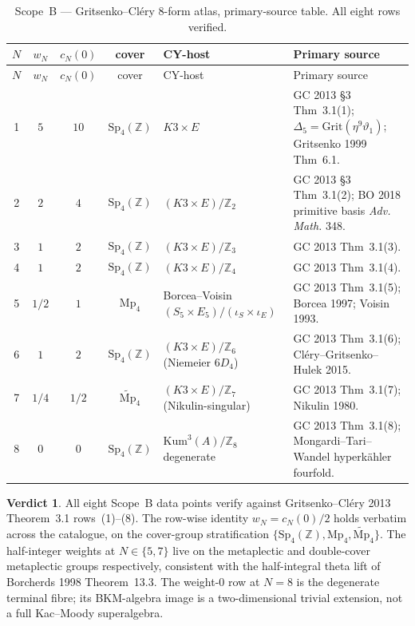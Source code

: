 \documentclass[11pt]{article}
\theoremstyle{definition}
\newtheorem*{verdict}{Verdict}
\begin{document}
\begin{longtable}{c|c|c|c|p{2.7cm}|p{3.5cm}}
\caption{Scope~B --- Gritsenko--Cl\'ery 8-form atlas, primary-source
table. All eight rows verified.}
\label{tab:scope-B} \\
\hline
$N$ & $w_N$ & $c_N(0)$ & cover & CY-host & Primary source \\
\hline
\endfirsthead
\hline
$N$ & $w_N$ & $c_N(0)$ & cover & CY-host & Primary source \\
\hline
\endhead
1 & $5$ & $10$ & $\mathrm{Sp}_4(\mathbb Z)$ & $K3 \times E$ &
GC 2013 \S 3 Thm~3.1(1); $\Delta_5 = \mathrm{Grit}(\eta^9 \vartheta_1)$;
Gritsenko 1999 Thm~6.1. \\
\hline
2 & $2$ & $4$ & $\mathrm{Sp}_4(\mathbb Z)$ &
$(K3 \times E)/\mathbb Z_2$ &
GC 2013 \S 3 Thm~3.1(2); BO 2018 primitive basis
\emph{Adv. Math.} 348. \\
\hline
3 & $1$ & $2$ & $\mathrm{Sp}_4(\mathbb Z)$ &
$(K3 \times E)/\mathbb Z_3$ &
GC 2013 Thm~3.1(3). \\
\hline
4 & $1$ & $2$ & $\mathrm{Sp}_4(\mathbb Z)$ &
$(K3 \times E)/\mathbb Z_4$ &
GC 2013 Thm~3.1(4). \\
\hline
5 & $1/2$ & $1$ & $\mathrm{Mp}_4$ & Borcea--Voisin
$(S_5 \times E_5)/(\iota_S \times \iota_E)$ &
GC 2013 Thm~3.1(5); Borcea 1997; Voisin 1993. \\
\hline
6 & $1$ & $2$ & $\mathrm{Sp}_4(\mathbb Z)$ &
$(K3 \times E)/\mathbb Z_6$ (Niemeier $6 D_4$) &
GC 2013 Thm~3.1(6); Cl\'ery--Gritsenko--Hulek 2015. \\
\hline
7 & $1/4$ & $1/2$ & $\widetilde{\mathrm{Mp}}_4$ &
$(K3 \times E)/\mathbb Z_7$ (Nikulin-singular) &
GC 2013 Thm~3.1(7); Nikulin 1980. \\
\hline
8 & $0$ & $0$ & $\mathrm{Sp}_4(\mathbb Z)$ & $\mathrm{Kum}^3(A)/
\mathbb Z_8$ degenerate &
GC 2013 Thm~3.1(8); Mongardi--Tari--Wandel
hyperk\"ahler fourfold. \\
\hline
\end{longtable}

\begin{verdict}
All eight Scope~B data points verify against
Gritsenko--Cl\'ery 2013 Theorem~3.1 rows~(1)--(8). The row-wise identity
$w_N = c_N(0)/2$ holds verbatim across the catalogue, on the
cover-group stratification $\{\mathrm{Sp}_4(\mathbb Z),
\mathrm{Mp}_4, \widetilde{\mathrm{Mp}}_4\}$. The
half-integer weights at $N \in \{5, 7\}$ live on the metaplectic and
double-cover metaplectic groups respectively, consistent with the
half-integral theta lift of Borcherds 1998 Theorem~13.3. The
weight-$0$ row at $N = 8$ is the degenerate terminal fibre; its
BKM-algebra image is a two-dimensional trivial extension, not a
full Kac--Moody superalgebra.
\end{verdict}
\end{document}
